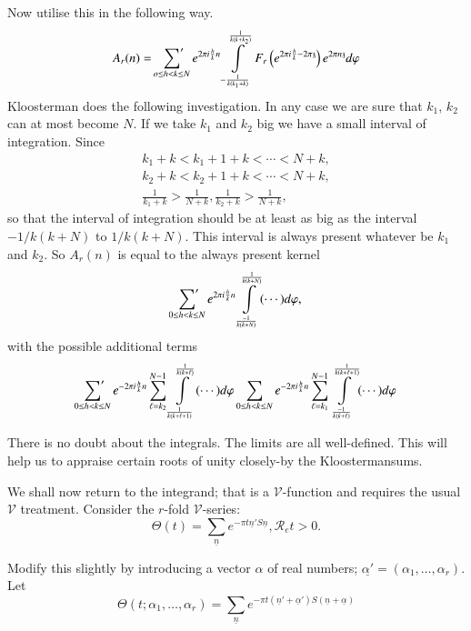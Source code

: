 Now utilise this in the following way.
$$
A_r (n) = \sideset{}{'}\sum_{o \leq h < k \leq N} e^{2 \pi i
  \frac{h}{k} n} \int\limits^{\frac{1}{k(k+k_2)}}_{-
    \frac{1}{k(k_1+k)}} F_r \left( e^{2 \pi i \frac{h}{k} - 2 \pi
    \mathfrak{z}}\right) e^{2 \pi n \mathfrak{z}} d \varphi
$$
Kloosterman does the following investigation. In any case we are sure
that $k_1$, $k_2$ can at most become $N$. If we take $k_1$ and $k_2$
big we have a small interval of integration. Since
\begin{gather*}
  k_1 + k < k_1+1 + k< \cdots < N+k,\\
  k_2 + k < k_2 +1 + k < \cdots < N+k,\\
  \frac{1}{k_1+k} > \frac{1}{N+k}, \frac{1}{k_2+k} > \frac{1}{N+k},
\end{gather*}\pageoriginale
so that the interval of integration should be at least as big as the
interval $-1/k(k+N)$ to $1/k(k+N)$. This interval is always present
whatever be $k_1$ and $k_2$. So $A_r(n)$ is equal to the always
present kernel
$$
\sideset{}{'}\sum_{0 \leq h < k \leq N} e^{2 \pi i
  \frac{h}{k} n} \int\limits^{\frac{1}{k(k+N)}}_{\frac{-1}{k(k+N)}}
(\cdots )d \varphi,
$$
with the possible additional terms
$$
\sideset{}{'}\sum_{0 \leq h < k \leq N} e^{-2 \pi i
  \frac{h}{k} n} \sum^{N-1}_{\ell =
  k_2}\int\limits^{\frac{1}{k(k+\ell)}}_{\frac{1}{k(k+\ell+1)}}
(\cdots) d \varphi 
\sum_{0 \leq h < k \leq N} e^{-2 \pi i
  \frac{h}{k} n} \sum^{N-1}_{\ell =
  k_1}\int\limits^{\frac{1}{k(k+\ell+1)}}_{\frac{-1}{k(k+\ell)}} 
(\cdots) d \varphi
$$

There is no doubt about the integrals. The limits are all
well-defined. This will help us to appraise certain roots of unity
closely-by the Kloosterman\pageoriginale sums.

We shall now return to the integrand; that is a $\mathscr{V}$-function
and requires the usual $\mathscr{V}$ treatment. Consider the $r$-fold
$\mathscr{V}$-series: 
$$
\Theta (t) = \sum_{\underline{n}} e^{- \pi t \underline{n}'
  S\underline{n}}, \mathscr{R}_e t> 0.
$$

Modify this slightly by introducing a vector $\alpha$ of real
numbers;\break  
$\underline{\alpha'} = (\alpha_1, \ldots , \alpha_r)$. Let 
$$
\Theta (t; \alpha_1, \ldots , \alpha_r)= \sum_{\underline{n}} e^{- \pi t
(\underline{n}' + \underline{\alpha}') S (\underline{n}+ \underline{\alpha})}
$$


